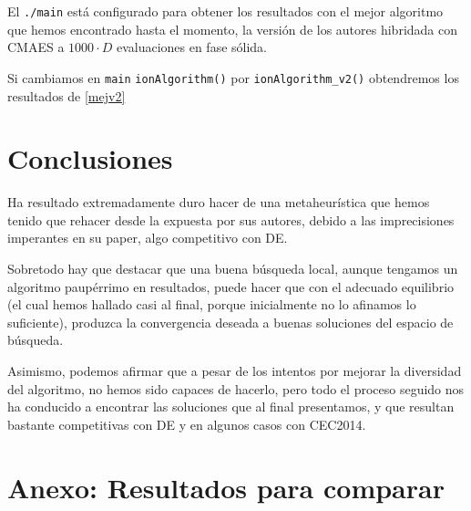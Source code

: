 \documentclass[a4paper,11pt]{article}
\begin{document}
El \texttt{./main} está configurado para obtener los resultados con el mejor algoritmo que hemos encontrado hasta el momento,
la versión de los autores hibridada con CMAES a $1000\cdot D$ evaluaciones en fase sólida.

Si cambiamos en \texttt{main} \texttt{ionAlgorithm()} por \texttt{ionAlgorithm\_v2()} obtendremos los resultados de \ref{mejv2}



\section{Conclusiones}

Ha resultado extremadamente duro hacer de una metaheurística que hemos tenido que rehacer desde la expuesta
por sus autores, debido a las imprecisiones imperantes en su paper, algo competitivo con DE.

Sobretodo hay que destacar que una buena búsqueda local, aunque tengamos un algoritmo paupérrimo en resultados, puede
hacer que con el adecuado equilibrio (el cual hemos hallado casi al final, porque inicialmente no lo afinamos lo suficiente),
produzca la convergencia deseada a buenas soluciones del espacio de búsqueda.

Asimismo, podemos afirmar que a pesar de los intentos por mejorar la diversidad del algoritmo, no hemos sido capaces de
hacerlo, pero todo el proceso seguido nos ha conducido a encontrar las soluciones que al final presentamos, y que
resultan bastante competitivas con DE y en algunos casos con CEC2014.

\section{Anexo: Resultados para comparar}
\end{document}
